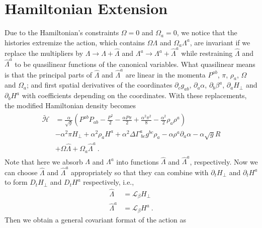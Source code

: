 \section{Hamiltonian Extension}\label{extension}
Due to the Hamiltonian's constraints $\Omega = 0$ and $\Omega_{a} = 0$, we notice that the histories extremize the action, which contains $\Omega \Lambda$ and $\Omega_{a}\Lambda^{a}$, are invariant if we replace the multipliers by $\Lambda \rightarrow \Lambda + {\hat \Lambda}$ and $\Lambda^{a} \rightarrow \Lambda^{a} + {\hat \Lambda}^{a}$ while restraining ${\hat \Lambda}$ and ${\hat \Lambda}^{a}$ to be quasilinear functions of the canonical variables. What quasilinear means is that the principal parts of ${\hat \Lambda}$ and ${\hat \Lambda}^{a}$ are linear in the momenta $P^{ab}$, $\pi$, $\rho_{a}$, $\Omega$ and $\Omega_{a}$; and first spatial derivatives of the coordinates $\partial_{c}g_{ab}$, $\partial_{a}\alpha$, $\partial_{b}\beta^{a}$, $\partial_{a}H_{\perp}$ and $\partial_{b}H^{a}$ with coefficients depending on the coordinates. With these replacements, the modified Hamiltonian density becomes
\begin{align}
\begin{split}
\tilde{\mathscr{H}} & = \frac{\alpha}{\sqrt{g}}\left(P^{ab}P_{ab} - \frac{P^{2}}{2} - \frac{\alpha P \pi}{2} + \frac{\alpha^{2}\pi^{2}}{8} - \frac{\alpha^{2}}{2}\rho_{a}\rho^{a}\right)\\
& -\alpha^{2}\pi H_{\perp} + \alpha^{2}\rho_{a}H^{a} + \alpha^{2}\Delta\Gamma^{a}_{~bc}g^{bc}\rho_{a} - \alpha \rho^{a}\partial_{a}\alpha - \alpha\sqrt{g}R\\
& + \Omega {\hat \Lambda} + \Omega_{a}{\hat \Lambda}^{a} \ .
\end{split}
\end{align}
Note that here we absorb $\Lambda$ and $\Lambda^{a}$ into functions ${\hat \Lambda}$ and ${\hat \Lambda}^{a}$, respectively. Now we can choose ${\hat \Lambda}$ and ${\hat \Lambda}^{a}$ appropriately so that they can combine with $\partial_{t}H_{\perp}$ and $\partial_{t}H^{a}$ to form $D_{t}H_{\perp}$ and $D_{t}H^{a}$ respectively, i.e., 
\begin{subequations}
\begin{align}
{\hat \Lambda} & = \mathcal{L}_{\beta}H_{\perp}\\
{\hat \Lambda}^{a} & = \mathcal{L}_{\beta}H^{a} \ .
\end{align}
\end{subequations}
Then we obtain a general covariant format of the action as
